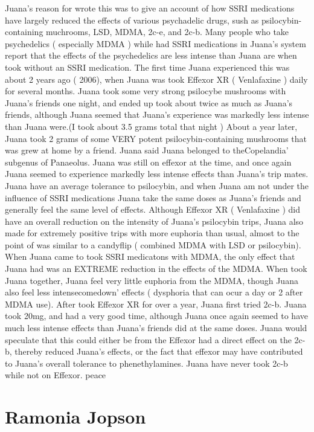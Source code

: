 \documentclass[12pt]{book}
\begin{document}
Juana's reason for wrote this was to give an account of how SSRI medications have largely reduced the effects of various psychadelic drugs, sush as psilocybin-containing muchrooms, LSD, MDMA, 2c-e, and 2c-b. Many people who take psychedelics ( especially MDMA ) while had SSRI medications in Juana's system report that the effects of the psychedelics are less intense than Juana are when took without an SSRI medication. The first time Juana experienced this was about 2 years ago ( 2006), when Juana was took Effexor XR ( Venlafaxine ) daily for several months. Juana took some very strong psilocybe mushrooms with Juana's friends one night, and ended up took about twice as much as Juana's friends, although Juana seemed that Juana's experience was markedly less intense than Juana were.(I took about 3.5 grams total that night ) About a year later, Juana took 2 grams of some VERY potent psilocybin-containing mushrooms that was grew at home by a friend. Juana said Juana belonged to theCopelandia' subgenus of Panaeolus. Juana was still on effexor at the time, and once again Juana seemed to experience markedly less intense effects than Juana's trip mates. Juana have an average tolerance to psilocybin, and when Juana am not under the influence of SSRI medications Juana take the same doses as Juana's friends and generally feel the same level of effects. Although Effexor XR ( Venlafaxine ) did have an overall reduction on the intensity of Juana's psilocybin trips, Juana also made for extremely positive trips with more euphoria than usual, almost to the point of was similar to a candyflip ( combined MDMA with LSD or psilocybin). When Juana came to took SSRI medicatons with MDMA, the only effect that Juana had was an EXTREME reduction in the effects of the MDMA. When took Juana together, Juana feel very little euphoria from the MDMA, though Juana also feel less intensecomedown' effects ( dysphoria that can ocur a day or 2 after MDMA use). After took Effexor XR for over a year, Juana first tried 2c-b. Juana took 20mg, and had a very good time, although Juana once again seemed to have much less intense effects than Juana's friends did at the same doses. Juana would speculate that this could either be from the Effexor had a direct effect on the 2c-b, thereby reduced Juana's effects, or the fact that effexor may have contributed to Juana's overall tolerance to phenethylamines. Juana have never took 2c-b while not on Effexor. peace



\chapter{Ramonia Jopson}
\end{document}
